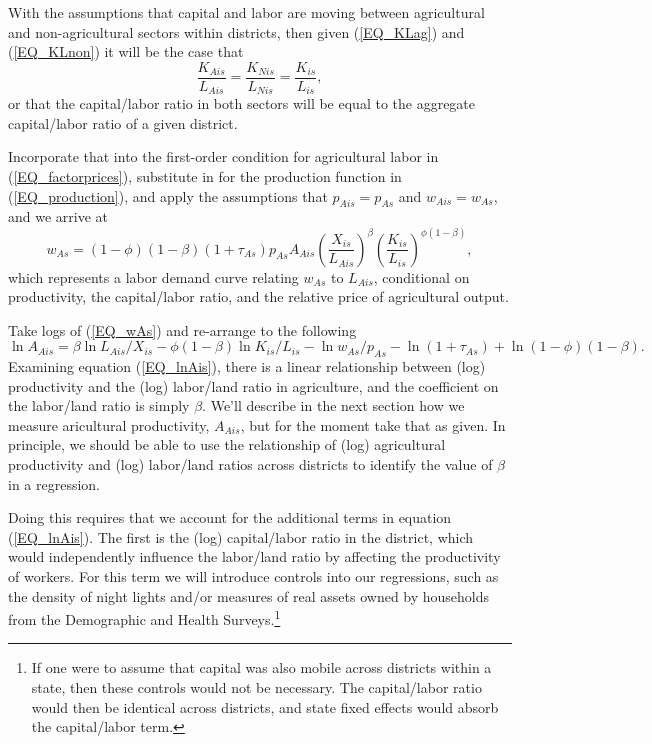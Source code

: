 \documentclass[11pt]{article}
\begin{document}
With the assumptions that capital and labor are moving between agricultural and non-agricultural sectors within districts, then given (\ref{EQ_KLag}) and (\ref{EQ_KLnon}) it will be the case that
\begin{equation*}
	\frac{K_{Ais}}{L_{Ais}} = \frac{K_{Nis}}{L_{Nis}} = \frac{K_{is}}{L_{is}},
\end{equation*}
or that the capital/labor ratio in both sectors will be equal to the aggregate capital/labor ratio of a given district.

Incorporate that into the first-order condition for agricultural labor in (\ref{EQ_factorprices}), substitute in for the production function in (\ref{EQ_production}), and apply the assumptions that $p_{Ais} = p_{As}$ and $w_{Ais} = w_{As}$, and we arrive at
\begin{equation}
	w_{As} = (1-\phi)(1-\beta) (1+\tau_{As}) p_{As} A_{Ais} \left(\frac{X_{is}}{L_{Ais}}\right)^{\beta} \left(\frac{K_{is}}{L_{is}}\right)^{\phi(1-\beta)}, \label{EQ_wAs}
\end{equation}
which represents a labor demand curve relating $w_{As}$ to $L_{Ais}$, conditional on productivity, the capital/labor ratio, and the relative price of agricultural output. 

Take logs of (\ref{EQ_wAs}) and re-arrange to the following
\begin{equation}
	\ln A_{Ais} = \beta \ln L_{Ais}/X_{is} - \phi(1-\beta) \ln K_{is}/L_{is} - \ln w_{As}/p_{As} - \ln (1+\tau_{As}) + \ln (1-\phi)(1-\beta). \label{EQ_lnAis}
\end{equation}
Examining equation (\ref{EQ_lnAis}), there is a linear relationship between (log) productivity and the (log) labor/land ratio in agriculture, and the coefficient on the labor/land ratio is simply $\beta$. We'll describe in the next section how we measure aricultural productivity, $A_{Ais}$, but for the moment take that as given. In principle, we should be able to use the relationship of (log) agricultural productivity and (log) labor/land ratios across districts to identify the value of $\beta$ in a regression.

Doing this requires that we account for the additional terms in equation (\ref{EQ_lnAis}). The first is the (log) capital/labor ratio in the district, which would independently influence the labor/land ratio by affecting the productivity of workers. For this term we will introduce controls into our regressions, such as the density of night lights and/or measures of real assets owned by households from the Demographic and Health Surveys.\footnote{If one were to assume that capital was also mobile across districts within a state, then these controls would not be necessary. The capital/labor ratio would then be identical across districts, and state fixed effects would absorb the capital/labor term.}
\end{document}
